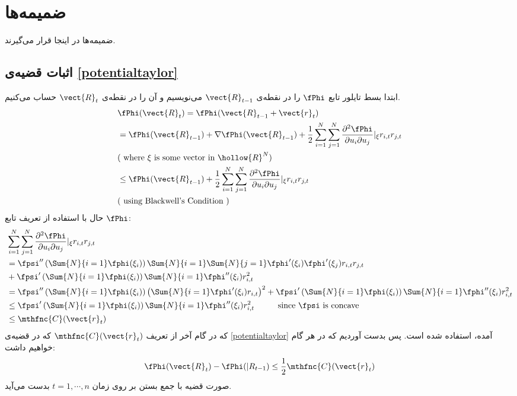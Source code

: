 \documentclass[a4paper,11px]{article}
\begin{document}
\section{
ضمیمه‌ها
}

ضمیمه‌ها در اینجا قرار می‌گیرند.

\subsection{
اثبات قضیه‌ی 
\ref{potentialtaylor}
}
ابتدا بسط تایلور تابع 
$\fPhi$ 
را در نقطه‌ی 
$\vect{R}_{t-1}$ 
می‌نویسیم و آن را در نقطه‌ی 
$\vect{R}_{t}$ 
حساب می‌کنیم.
\[
\begin{split}
&\fPhi( \vect{R}_{t} ) = \fPhi( \vect{R}_{t-1} + \vect{r}_t )\\
&= \fPhi( \vect{R}_{t-1} ) + \nabla \fPhi( \vect{R}_{t-1} ) + \frac{1}{2} \sum^{N}_{i=1} \sum^{N}_{j=1} \frac{ \partial^2 \fPhi }{ \partial u_i \partial u_j } \vert_{\xi} r_{i,t} r_{j,t}\\
& ( \mbox{ where } \xi \mbox{ is some vector in } \hollow{R}^N )\\
&\leq \fPhi( \vect{R}_{t-1} ) + \frac{1}{2} \sum^{N}_{i=1} \sum^{N}_{j=1} \frac{ \partial^2 \fPhi }{ \partial u_i \partial u_j } \vert_{\xi} r_{i,t} r_{j,t}\\
& ( \mbox{ using Blackwell's Condition } )
\end{split}
\]
حال با استفاده از تعریف تابع 
$\fPhi$:
\[
\begin{split}
&\sum^{N}_{i=1} \sum^{N}_{j=1} \frac{\partial^2 \fPhi}{\partial u_i \partial u_j}\vert_{\xi} r_{i,t} r_{j,t}\\
&= \fpsi^{\prime\prime} \left( \Sum{N}{i=1} \fphi(\xi_i) \right) \Sum{N}{i=1} \Sum{N}{j=1} \fphi^\prime (\xi_i) \fphi^\prime (\xi_j) r_{i,t} r_{j,t}\\
& + \fpsi^\prime \left( \Sum{N}{i=1} \fphi(\xi_i) \right) \Sum{N}{i=1} \fphi^{\prime\prime} (\xi_i) r^{2}_{i,t}\\
&= \fpsi^{\prime\prime} \left( \Sum{N}{i=1} \fphi(\xi_i) \right) \left( \Sum{N}{i=1} \fphi^{\prime} (\xi_i) r_{i,t} \right)^2 + \fpsi^\prime \left( \Sum{N}{i=1} \fphi( \xi_i ) \right) \Sum{N}{i=1} \fphi^{\prime\prime} (\xi_i) r^{2}_{i,t}\\
& \leq \fpsi^\prime \left( \Sum{N}{i=1} \fphi( \xi_i ) \right) \Sum{N}{i=1} \fphi^{\prime\prime} (\xi_i) r^{2}_{i,t} \hspace{1cm} \mbox{since } \fpsi \mbox{ is concave}\\
& \leq \mthfnc{C} (\vect{r}_t)
\end{split}
\]
که در گام آخر از تعریف 
$\mthfnc{C} (\vect{r}_t)$ 
که در قضیه‌ی
\ref{potentialtaylor} 
آمده، استفاده شده است. پس بدست آوردیم که در هر گام خواهیم داشت:
\[
\fPhi (\vect{R}_{t}) - \fPhi (\vert{R}_{t-1}) \leq \frac{1}{2} \mthfnc{C} (\vect{r}_t)
\]
صورت قضیه با جمع بستن بر روی زمان 
$t = 1, \cdots, n$ 
بدست می‌آید.
\end{document}
